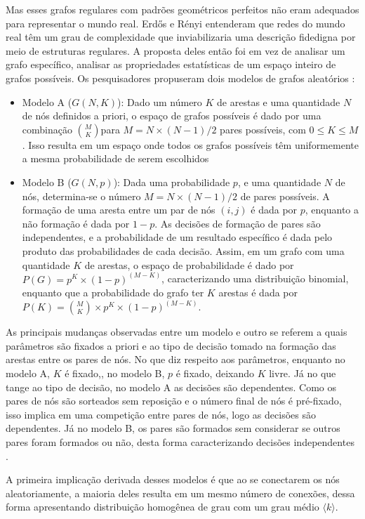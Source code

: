 \documentclass[12pt,oneside,a4paper,brazil,sumario=tradicional]{abntex2}
\begin{document}
Mas esses grafos regulares com padrões geométricos perfeitos não eram adequados para representar o mundo real. Erdős e Rényi entenderam que redes do mundo real têm um grau de complexidade que inviabilizaria uma descrição fidedigna por meio de estruturas regulares. A proposta deles então foi em vez de analisar um grafo específico, analisar as propriedades estatísticas de um espaço inteiro de grafos possíveis. Os pesquisadores propuseram dois modelos de grafos aleatórios \cite{latora2017}:

\begin{itemize}
  \item Modelo A ($G(N,K)$): Dado um número $K$ de arestas e uma quantidade $N$ de nós definidos a priori, o espaço de grafos possíveis é dado por uma combinação $\binom{M}{K}$para $M = N \times (N-1)/2$ pares possíveis, com $0 \le K \le M$. Isso resulta em um espaço onde todos os grafos possíveis têm uniformemente a mesma probabilidade de serem escolhidos
  \item Modelo B ($G(N,p)$): Dada uma probabilidade $p$, e uma quantidade $N$ de nós, determina-se o número $M = N \times (N-1)/2$ de pares possíveis. A formação de uma aresta entre um par de nós $(i,j)$ é dada por $p$, enquanto a não formação é dada por $1-p$. As decisões de formação de pares são independentes, e a probabilidade de um resultado específico é dada pelo produto das probabilidades de cada decisão. Assim, em um grafo com uma quantidade $K$ de arestas, o espaço de probabilidade é dado por  $P(G) = p^{K} \times (1-p)^{(M-K)}$, caracterizando uma distribuição binomial, enquanto que a probabilidade do grafo ter $K$ arestas é dada por $P(K) = \binom{M}{K} \times p^{K} \times (1-p)^{(M-K)}$.
\end{itemize}
As principais mudanças observadas entre um modelo e outro se referem a quais parâmetros são fixados a priori e ao tipo de decisão tomado na formação das arestas entre os pares de nós. No que diz respeito aos parâmetros, enquanto no modelo A, $K$ é fixado,, no modelo B, $p$ é fixado, deixando $K$ livre. Já no que tange ao tipo de decisão, no modelo A as decisões são dependentes. Como os pares de nós são sorteados sem reposição e o número final de nós é pré-fixado, isso implica em uma competição entre pares de nós, logo as decisões são dependentes. Já no modelo B, os pares são formados sem considerar se outros pares foram formados ou não, desta forma caracterizando decisões independentes  \cite{latora2017}.

A primeira implicação derivada desses modelos é que ao se conectarem os nós aleatoriamente, a maioria deles resulta em um mesmo número de conexões, dessa forma apresentando distribuição homogênea de grau com um grau médio $\langle k \rangle$.
\end{document}
